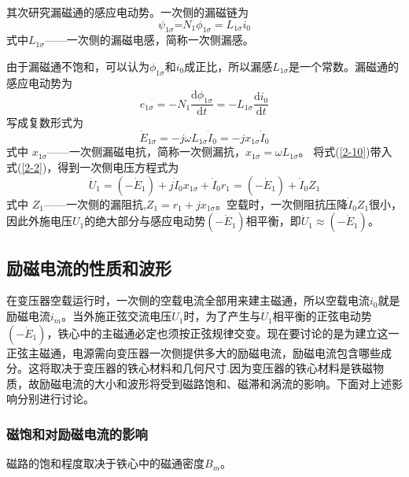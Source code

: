 \documentclass{book}
\begin{document}
其次研究漏磁通的感应电动势。一次侧的漏磁链为
\[{{\psi }_{1\sigma }}\text{=}{{N}_{1}}{{\phi }_{1\sigma }}={{L}_{1\sigma }}{{i}_{0}}\]
式中${{L}_{1\sigma }}$——一次侧的漏磁电感，简称一次侧漏感。

由于漏磁通不饱和，可以认为${{\phi }_{1\sigma }}$和${{i}_{0}}$成正比，所以漏感${{L}_{1\sigma }}$是一个常数。漏磁通的感应电动势为
\[{{e}_{1\sigma }}=-{{N}_{1}}\frac{\text{d}{{\phi }_{1\sigma }}}{\text{d}t}=-{{L}_{1\sigma }}\frac{\text{d}{{i}_{0}}}{\text{d}t}\]
写成复数形式为
\begin{equation}
{{\dot{E}}_{1\sigma }}=-j\omega {{L}_{1\sigma }}{{\dot{I}}_{0}}=-j{{x}_{1\sigma }}{{\dot{I}}_{0}}
\label{2-12}
\end{equation}
式中  ${{x }_{1\sigma }}$——一次侧漏磁电抗，简称一次侧漏抗，${{x}_{1\sigma }}=\omega {{L}_{1\sigma }}$。
将式(\ref{2-10})带入式(\ref{2-2})，得到一次侧电压方程式为
\begin{equation}
{{\dot{U}}_{1}}=\left( -{{{\dot{E}}}_{1}} \right)+j{{\dot{I}}_{0}}{{x}_{1\sigma }}+{{\dot{I}}_{0}}{{r}_{1}}=\left( -{{{\dot{E}}}_{1}} \right)+{{\dot{I}}_{0}}{{Z}_{1}}
\label{2-13}
\end{equation}
式中  ${{Z}_{1}}$——一次侧的漏阻抗,${{Z}_{1}}={{r}_{1}}+j{{x}_{1\sigma }}$。空载时，一次侧阻抗压降${{\dot{I}}_{0}}{{Z}_{1}}$很小，因此外施电压${{U}_{1}}$的绝大部分与感应电动势$\left( -{{{\dot{E}}}_{1}} \right)$相平衡，即${{\dot{U}}_{1}}\approx \left( -{{{\dot{E}}}_{1}} \right)$。
\subsection{励磁电流的性质和波形}
在变压器空载运行时，一次侧的空载电流全部用来建主磁通，所以空载电流${{i}_{0}}$就是励磁电流${{i}_{m}}$。当外施正弦交流电压${{\dot{U}}_{1}}$时，为了产生与${{\dot{U}}_{1}}$相平衡的正弦电动势$\left( -{{{\dot{E}}}_{1}} \right)$，铁心中的主磁通必定也须按正弦规律交变。现在要讨论的是为建立这一正弦主磁通，电源需向变压器一次侧提供多大的励磁电流，励磁电流包含哪些成分。这将取决于变压器的铁心材料和几何尺寸.因为变压器的铁心材料是铁磁物质，故励磁电流的大小和波形将受到磁路饱和、磁滞和涡流的影响。下面对上述影响分别进行讨论。
\subsubsection{磁饱和对励磁电流的影响}
磁路的饱和程度取决于铁心中的磁通密度${{B}_{m}}$。
\end{document}

